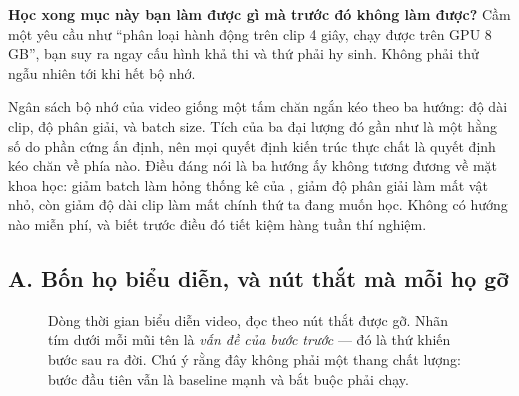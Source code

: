 \documentclass[../../../deep_learning.tex]{subfiles}
\begin{document}
\textbf{Học xong mục này bạn làm được gì mà trước đó không làm được?} Cầm một yêu cầu như ``phân loại hành động trên clip 4 giây, chạy được trên GPU 8\,GB'', bạn suy ra ngay cấu hình khả thi và thứ phải hy sinh. Không phải thử ngẫu nhiên tới khi hết bộ nhớ.

\begin{trucgiac}
Ngân sách bộ nhớ của video giống một tấm chăn ngắn kéo theo ba hướng: độ dài clip, độ phân giải, và batch size. Tích của ba đại lượng đó gần như là một hằng số do phần cứng ấn định, nên mọi quyết định kiến trúc thực chất là quyết định kéo chăn về phía nào. Điều đáng nói là ba hướng ấy không tương đương về mặt khoa học: giảm batch làm hỏng thống kê của , giảm độ phân giải làm mất vật nhỏ, còn giảm độ dài clip làm mất chính thứ ta đang muốn học. Không có hướng nào miễn phí, và biết trước điều đó tiết kiệm hàng tuần thí nghiệm.
\end{trucgiac}


\subsection{A. Bốn họ biểu diễn, và nút thắt mà mỗi họ gỡ}

\begin{figure}[H]\centering
{}
\caption{Dòng thời gian biểu diễn video, đọc theo nút thắt được gỡ. Nhãn tím dưới mỗi mũi tên là \emph{vấn đề của bước trước} --- đó là thứ khiến bước sau ra đời. Chú ý rằng đây không phải một thang chất lượng: bước đầu tiên vẫn là baseline mạnh và bắt buộc phải chạy.}
\label{fig:video-timeline}
\end{figure}
\end{document}
